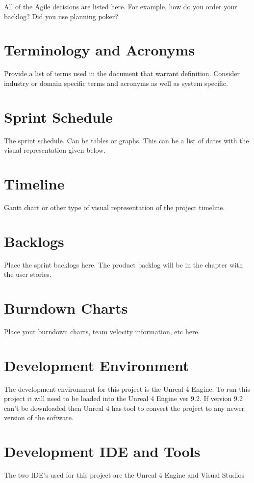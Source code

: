 All of the Agile decisions are listed here.  For example, how do you order your backlog?   
Did you use planning poker?   

\section{Terminology and Acronyms}
Provide a list of terms used in the document that warrant definition.  Consider 
industry or domain specific terms and acronyms as well as system specific. 

\section{Sprint Schedule}
The sprint schedule.  Can be tables or graphs.   This can be a list of dates with the visual 
representation given below.

\section{Timeline}
Gantt chart or other type of visual representation of the project timeline.

\section{Backlogs}
Place the sprint backlogs here.    The product backlog will be in the chapter with the user 
stories.

\section{Burndown Charts}
Place your burndown charts, team velocity information, etc here.   


\section{Development Environment}
The development environment for this project is the Unreal 4 Engine. To run this project it will need to be loaded into the Unreal 4 Engine ver 9.2. If version 9.2 can't be downloaded then Unreal 4 has tool to convert the project to any newer version of the software.


\section{Development IDE and Tools}
The two IDE's used for this project are the Unreal 4 Engine and Visual Studios

